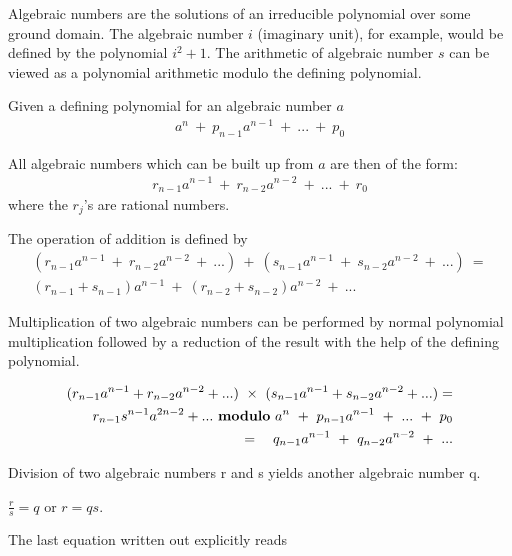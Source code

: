 

Algebraic numbers are the solutions of an irreducible polynomial over
some ground domain.   The algebraic number $i$ (imaginary
unit),  for example, would be defined by the
polynomial $i^2 + 1$.  The arithmetic of algebraic number $s$ can be
viewed as a polynomial arithmetic modulo the defining polynomial.

Given a defining polynomial for an algebraic number $a$
\begin{eqnarray*}
a^n ~ + ~ {p _{n-1}} {a ^ {n -1}} ~ + ~ ... ~ + ~ {p_0}
\end{eqnarray*}

All algebraic numbers which can be built up from $a$ are then of the form:
\begin{eqnarray*}
{r_{n-1}} {a ^{n-1}} ~+~ {r_{n-2}} {a ^{n-2}} ~+~ ... ~+~ {r_0}
\end{eqnarray*}
where the $r_j$'s are rational numbers.

The operation of addition is defined by
\begin{eqnarray*}
({r_{n-1}} {a ^{n-1}} ~+~ {r_{n-2}} {a ^{n-2}} ~+~ ...) ~ + ~
({s_{n-1}} {a ^{n-1}} ~+~ {s_{n-2}} {a ^{n-2}} ~+~ ...) ~ =  \\
({r_{n-1}+s_{n-1}}) {a ^{n-1}} ~+~ ({r_{n-2}+s_{n-2}}) {a ^{n-2}} ~+~ ...
\end{eqnarray*}

Multiplication of two algebraic numbers can be performed by normal
polynomial multiplication followed by a reduction of the result with the
help of the defining polynomial.

\begin{eqnarray*}
({r_{n-1}} {a ^{n-1}} + {r_{n-2}} {a ^{n-2}} + ...) ~ \times ~
({s_{n-1}} {a ^{n-1}} + {s_{n-2}} {a ^{n-2}} + ...) = \\
 {r_{n-1}} {s ^{n-1}}{a^{2n-2}} +  ... ~ {\bf modulo} ~
a^n ~ + ~ {p _{n-1}} {a ^ {n -1}} ~ + ~ ... ~ + ~ {p_0} \\
= ~~~{q_{n-1}} a^{n-1} ~ + ~ {q _{n-2}} {a ^ {n -2}} ~ + ~ ...
\end{eqnarray*}

Division of two algebraic numbers r and s yields another algebraic number q.

$ \frac{r}{s} = q$ or $ r = q s $.

The last equation written out explicitly reads

